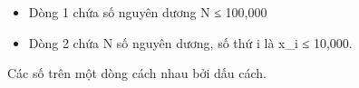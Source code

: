 \begin{itemize}
	\item Dòng 1 chứa số nguyên dương N ≤ 100,000
	\item Dòng 2 chứa N số nguyên dương, số thứ i là x\_i ≤ 10,000.
\end{itemize}

Các số trên một dòng cách nhau bởi dấu cách.